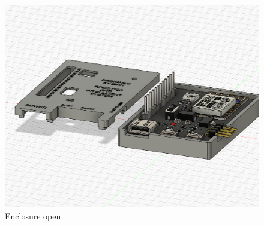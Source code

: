 \begin{figure}[H]
    \centering
    \includegraphics[width=0.6\linewidth]{P3/img/Casing board v20 open.png}
    \caption{Enclosure open}
    \label{fig:Enclosure open}
\end{figure}